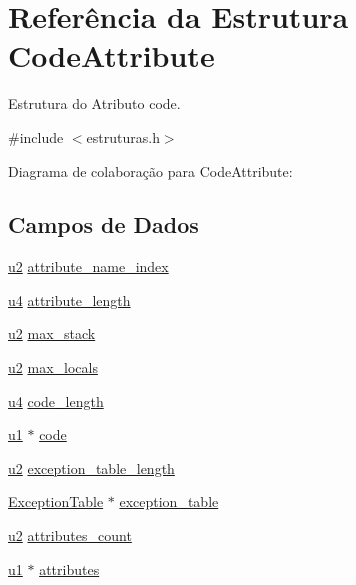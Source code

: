 \hypertarget{struct_code_attribute}{}\section{Referência da Estrutura Code\+Attribute}
\label{struct_code_attribute}


Estrutura do Atributo code.  




{\ttfamily \#include $<$estruturas.\+h$>$}



Diagrama de colaboração para Code\+Attribute\+:
\subsection*{Campos de Dados}
\begin{DoxyCompactItemize}
\item 
\hyperlink{estruturas_8h_a5f223212eef04d10a4550ded680cb1cf}{u2} \hyperlink{struct_code_attribute_a87132111c747d163d9b94ec155c1e1db}{attribute\+\_\+name\+\_\+index}
\item 
\hyperlink{estruturas_8h_aedf6ddc03df8caaaccbb4c60b9a9b850}{u4} \hyperlink{struct_code_attribute_a612405902fb38f8f04e8cd55e875a3a5}{attribute\+\_\+length}
\item 
\hyperlink{estruturas_8h_a5f223212eef04d10a4550ded680cb1cf}{u2} \hyperlink{struct_code_attribute_a61e8f2685ef2bb170d72e402a0e72ca2}{max\+\_\+stack}
\item 
\hyperlink{estruturas_8h_a5f223212eef04d10a4550ded680cb1cf}{u2} \hyperlink{struct_code_attribute_a1407b9bddee5eca9e0b0b20fbf1a8f1f}{max\+\_\+locals}
\item 
\hyperlink{estruturas_8h_aedf6ddc03df8caaaccbb4c60b9a9b850}{u4} \hyperlink{struct_code_attribute_a6758c92d94ab2ba7db0ddc3e5f4520bc}{code\+\_\+length}
\item 
\hyperlink{estruturas_8h_a216a9f8b04b4f0af84a4ca9d1d85a6ca}{u1} $\ast$ \hyperlink{struct_code_attribute_ace67f68bc8bc1d0ee3f86f173a83d7aa}{code}
\item 
\hyperlink{estruturas_8h_a5f223212eef04d10a4550ded680cb1cf}{u2} \hyperlink{struct_code_attribute_a7c7ee411e88e741a868818e3cc2171ca}{exception\+\_\+table\+\_\+length}
\item 
\hyperlink{struct_exception_table}{Exception\+Table} $\ast$ \hyperlink{struct_code_attribute_a6140184ac696cdd4d000aa00388c5a0f}{exception\+\_\+table}
\item 
\hyperlink{estruturas_8h_a5f223212eef04d10a4550ded680cb1cf}{u2} \hyperlink{struct_code_attribute_a550161b02b161e5ab2c489d33831d175}{attributes\+\_\+count}
\item 
\hyperlink{estruturas_8h_a216a9f8b04b4f0af84a4ca9d1d85a6ca}{u1} $\ast$ \hyperlink{struct_code_attribute_adafab3efe6d9eefdead891ef70badea8}{attributes}
\end{DoxyCompactItemize}


